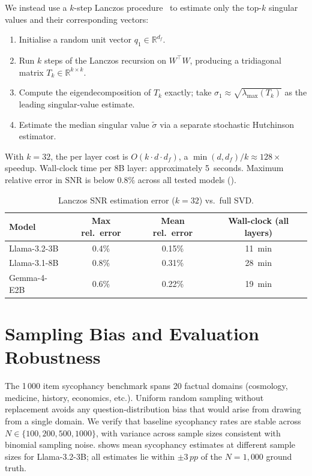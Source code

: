\documentclass{article}
\newcommand{\snr}{\mathrm{SNR}}
\newcommand{\pp}{\,pp}
\begin{document}
We instead use a $k$-step Lanczos
procedure~\citep{noelGeometryReasonSpectral2025} to estimate only the
top-$k$ singular values and their corresponding vectors:
\begin{enumerate}[itemsep=2pt,topsep=2pt]
\item Initialise a random unit vector $q_1 \in \mathbb{R}^{d_f}$.
\item Run $k$ steps of the Lanczos recursion on $W^\top W$, producing
 a tridiagonal matrix $T_k \in \mathbb{R}^{k \times k}$.
\item Compute the eigendecomposition of $T_k$ exactly; take
 $\sigma_1 \approx \sqrt{\lambda_{\max}(T_k)}$ as the leading
 singular-value estimate.
\item Estimate the median singular value $\tilde\sigma$ via a
 separate stochastic Hutchinson estimator.
\end{enumerate}
With $k{=}32$, the per layer cost is $O(k \cdot d \cdot d_f)$, a
$\min(d,d_f)/k \approx 128\times$ speedup. Wall-clock time per 8B
layer: approximately 5~seconds. Maximum relative error in $\snr$ is
below $0.8\%$ across all tested models ().

\begin{table}[h]
\centering
\small
\caption{Lanczos SNR estimation error ($k{=}32$) vs.\ full SVD.}
\label{tab:lanczos_error}
\begin{tabular}{lccc}
\toprule
Model & Max rel.\ error & Mean rel.\ error & Wall-clock (all layers) \\
\midrule
Llama-3.2-3B & 0.4\% & 0.15\% & 11~min \\
Llama-3.1-8B & 0.8\% & 0.31\% & 28~min \\
Gemma-4-E2B & 0.6\% & 0.22\% & 19~min \\
\bottomrule
\end{tabular}
\end{table}

\section{Sampling Bias and Evaluation Robustness}
\label{app:sampling_bias}

The 1\,000 item sycophancy benchmark spans 20 factual domains
(cosmology, medicine, history, economics, etc.). Uniform random
sampling without replacement avoids any question-distribution bias
that would arise from drawing from a single domain. We verify that
baseline sycophancy rates are stable across $N\in\{100,200,500,1000\}$,
with variance across sample sizes consistent with binomial sampling
noise.  shows mean sycophancy
estimates at different sample sizes for Llama-3.2-3B; all estimates
lie within $\pm 3\pp$ of the $N{=}1{,}000$ ground truth.
\end{document}
